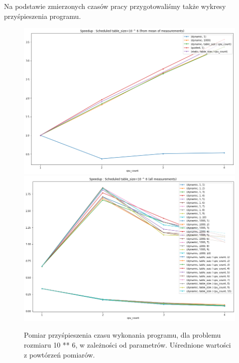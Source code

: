 \documentclass{article}
\begin{document}
        Na podstawie zmierzonych czasów pracy przygotowaliśmy także wykresy przyśpieszenia programu.
        \begin{figure}[h!]
            \centering
            \includegraphics[width=17cm]{report2/images/TableSize/ex3_tb6_speedup.png}
            \includegraphics[width=17cm]{report2/images/TableSize/ex3_tb6_speedup_all.png}
            \caption{Pomiar przyśpieszenia czasu wykonania programu, dla problemu rozmiaru 10 ** 6, w zależności od parametrów. Uśrednione wartości z powtórzeń pomiarów. }
        \end{figure}
        \newpage
\end{document}
